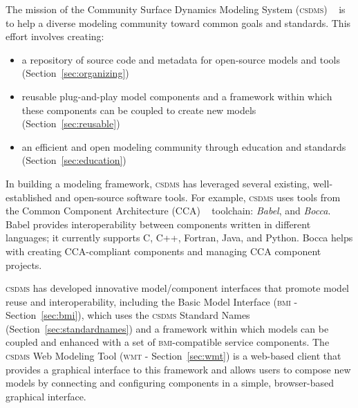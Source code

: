\documentclass[11pt, oneside]{amsart}
\DeclareRobustCommand{\csdms}{\textsc{csdms}}
\DeclareRobustCommand{\bmi}{\textsc{bmi}}
\DeclareRobustCommand{\wmt}{\textsc{wmt}}
\begin{document}
The mission of the Community Surface Dynamics Modeling System (\csdms{})
~\cite{peckham2012component} is to help a diverse modeling community toward
common goals and standards.
This effort involves creating:
\begin{itemize}
  \item a repository of source code and metadata for open-source models and
    tools (Section~\ref{sec:organizing})
  \item reusable plug-and-play model components and a framework
        within which these components can be coupled to create new models
        (Section~\ref{sec:reusable})
  \item an efficient and open modeling community through education and
        standards (Section~\ref{sec:education})
\end{itemize}


In building a modeling framework, \csdms{} has leveraged
several existing, well-established and open-source software tools. For example,
\csdms{} uses tools from the Common Component Architecture (CCA)
~\cite{armstrong1999toward} toolchain: \emph{Babel}, and \emph{Bocca}. Babel
provides interoperability between components
written in different languages; it currently supports C, C++, Fortran, Java,
and Python. Bocca helps with creating CCA-compliant components and managing CCA
component projects.

\csdms{} has developed innovative model/component interfaces that promote
model reuse and interoperability,
including the Basic Model Interface (\bmi{} - Section~\ref{sec:bmi}), which
uses
the \csdms{} Standard Names (Section~\ref{sec:standardnames}) and a framework
within which models can be coupled and enhanced with a set of \bmi{}-compatible
service components.
The \csdms{} Web Modeling Tool (\wmt{} - Section~\ref{sec:wmt}) is a web-based client that provides a
graphical interface to this framework and allows users to compose new models
by connecting and configuring components in a simple, browser-based graphical
interface.
\end{document}

